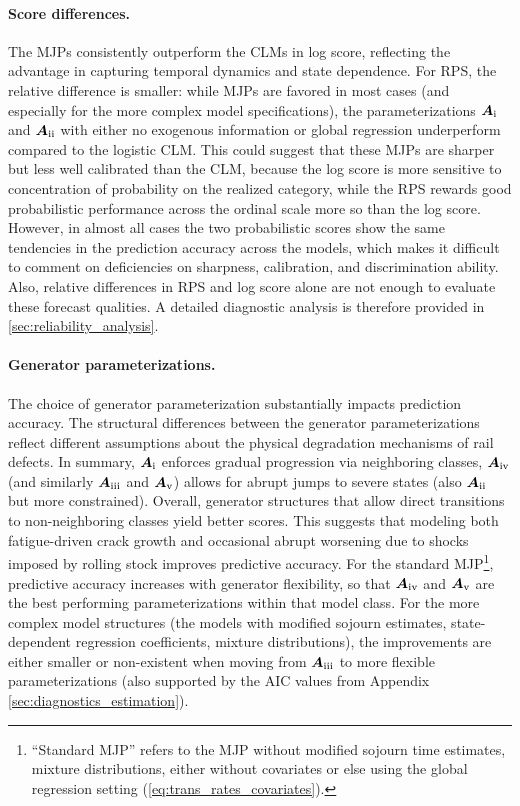 \documentclass{article}
\newcommand{\RN}[1]{\textup{\uppercase\expandafter{\romannumeral#1}}}
\begin{document}
\paragraph{Score differences.}
The MJPs consistently outperform the CLMs in log score, reflecting the advantage in capturing temporal dynamics and state dependence. For RPS, the relative difference is smaller: while MJPs are favored in most cases (and especially for the more complex model specifications), the parameterizations $\bm{A}_{\RN{1}}$ and $\bm{A}_{\RN{2}}$ with either no exogenous information or global regression underperform compared to the logistic CLM. This could suggest that these MJPs are sharper but less well calibrated than the CLM, because the log score is more sensitive to concentration of probability on the realized category, while the RPS rewards good probabilistic performance across the ordinal scale more so than the log score.
However, in almost all cases the two probabilistic scores show the same tendencies in the prediction accuracy across the models, which makes it difficult to comment on deficiencies on sharpness, calibration, and discrimination ability. Also, relative differences in RPS and log score alone are not enough to evaluate these forecast qualities. A detailed diagnostic analysis is therefore provided in \cref{sec:reliability_analysis}.

\paragraph{Generator parameterizations.}
The choice of generator parameterization substantially impacts prediction accuracy. 
The structural differences between the generator parameterizations reflect different assumptions about the physical degradation mechanisms of rail defects.
In summary, $\bm{A}_{\RN{1}}$ enforces gradual progression via neighboring classes, $\bm{A}_{\RN{4}}$ (and similarly $\bm{A}_{\RN{3}}$ and $\bm{A}_{\RN{5}}$) allows for abrupt jumps to severe states (also $\bm{A}_{\RN{2}}$ but more constrained). 
Overall, generator structures that allow direct transitions to non-neighboring classes yield better scores. This suggests that modeling both fatigue-driven crack growth and occasional abrupt worsening due to shocks imposed by rolling stock improves predictive accuracy.
For the standard MJP\footnote{``Standard MJP'' refers to the MJP without modified sojourn time estimates, mixture distributions, either without covariates or else using the global regression setting (\cref{eq:trans_rates_covariates}).}, predictive accuracy increases with generator flexibility, so that $\bm{A}_{\RN{4}}$ and $\bm{A}_{\RN{5}}$ are the best performing parameterizations within that model class. For the more complex model structures (the models with modified sojourn estimates, state-dependent regression coefficients, mixture distributions), the improvements are either smaller or non-existent when moving from $\bm{A}_{\RN{3}}$ to more flexible parameterizations (also supported by the AIC values from Appendix \ref{sec:diagnostics_estimation}).
\end{document}
